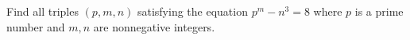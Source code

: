 Find all triples $(p,m,n)$ satisfying the equation $p^m-n^3=8$ where $p$ is a prime number and $m,n$ are nonnegative integers.